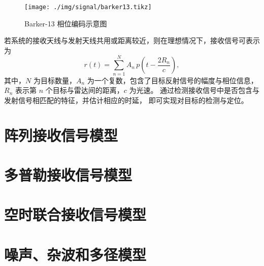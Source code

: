 \begin{figure}[htb!]
    \centering
    \texttt{[image: ./img/signal/barker13.tikz]}
    \caption{Barker-13 相位编码示意图}
    \label{fig_barker}
\end{figure}

若系统的接收天线与发射天线共用或距离较近，则在理想情况下，接收信号可表示为
\[
    r(t) = \sum_{n=1}^{N} A_n\, p\left(t - \frac{2 R_n}{c}\right),
\]
其中，$N$ 为目标数量，$A_n$ 为一个复数，包含了目标反射信号的幅度与相位信息，
$R_n$ 表示第 $n$ 个目标与雷达间的距离，$c$ 为光速。
通过检测接收信号中是否包含与发射信号相匹配的特征，并估计相应的时延，
即可实现对目标的检测与定位。

\section{阵列接收信号模型}

\section{多普勒接收信号模型}

\section{空时联合接收信号模型}

\section{噪声、杂波和多径模型}
